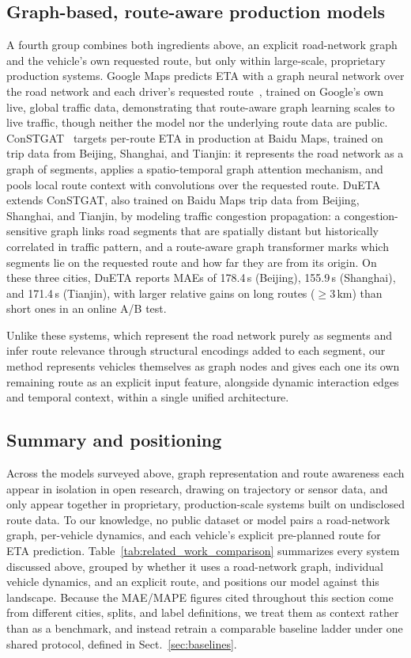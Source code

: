 \subsection{Graph-based, route-aware production models}\label{sec:rw-graph-route}
A fourth group combines both ingredients above, an explicit road-network graph and the vehicle's own requested route, but only within large-scale, proprietary production systems. Google Maps predicts ETA with a graph neural network over the road network and each driver's requested route~\cite{derrowpinion2021googlemaps}, trained on Google's own live, global traffic data, demonstrating that route-aware graph learning scales to live traffic, though neither the model nor the underlying route data are public. ConSTGAT~\cite{constgat2020} targets per-route ETA in production at Baidu Maps, trained on trip data from Beijing, Shanghai, and Tianjin: it represents the road network as a graph of segments, applies a spatio-temporal graph attention mechanism, and pools local route context with convolutions over the requested route. DuETA~\cite{dueta2023} extends ConSTGAT, also trained on Baidu Maps trip data from Beijing, Shanghai, and Tianjin, by modeling traffic congestion propagation: a congestion-sensitive graph links road segments that are spatially distant but historically correlated in traffic pattern, and a route-aware graph transformer marks which segments lie on the requested route and how far they are from its origin. On these three cities, DuETA reports MAEs of 178.4\,s (Beijing), 155.9\,s (Shanghai), and 171.4\,s (Tianjin), with larger relative gains on long routes ($\geq$3\,km) than short ones in an online A/B test.

Unlike these systems, which represent the road network purely as segments and infer route relevance through structural encodings added to each segment, our method represents vehicles themselves as graph nodes and gives each one its own remaining route as an explicit input feature, alongside dynamic interaction edges and temporal context, within a single unified architecture.

\subsection{Summary and positioning}
Across the models surveyed above, graph representation and route awareness each appear in isolation in open research, drawing on trajectory or sensor data, and only appear together in proprietary, production-scale systems built on undisclosed route data. To our knowledge, no public dataset or model pairs a road-network graph, per-vehicle dynamics, and each vehicle's explicit pre-planned route for ETA prediction. Table~\ref{tab:related_work_comparison} summarizes every system discussed above, grouped by whether it uses a road-network graph, individual vehicle dynamics, and an explicit route, and positions our model against this landscape. Because the MAE/MAPE figures cited throughout this section come from different cities, splits, and label definitions, we treat them as context rather than as a benchmark, and instead retrain a comparable baseline ladder under one shared protocol, defined in Sect.~\ref{sec:baselines}.

